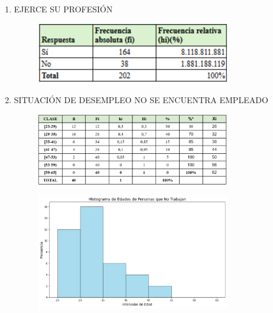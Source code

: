 \documentclass[12pt, a4paper]{article}
\begin{document}
\begin{enumerate}
    \item EJERCE SU PROFESIÓN
    \begin{figure}[H]
        \begin{center}
            \includegraphics[width=0.80\textwidth]{images/ejerceProfesion.png}
        \end{center}
        \label{fig:ejerceProfesion}
    \end{figure}
    \item SITUACIÓN DE DESEMPLEO
    NO SE ENCUENTRA EMPLEADO
    \begin{figure}[H]
        \begin{center}
            \includegraphics[width=0.80\textwidth]{images/noEncuentra.png}
        \end{center}
        \label{fig:noEncuentra}
    \end{figure}
    \begin{figure}[H]
        \begin{center}
            \includegraphics[width=0.80\textwidth]{images/johan.jpg}
        \end{center}
        \label{fig:noEcHist}
    \end{figure}


\end{enumerate}
\end{document}
